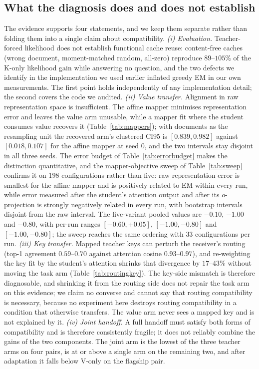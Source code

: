 \documentclass[11pt]{article}
\begin{document}
\subsection{What the diagnosis does and does not establish}
\label{sec:discussion-scope}
The evidence supports four statements, and we keep them separate rather than
folding them into a single claim about compatibility.
\emph{(i) Evaluation.} Teacher-forced likelihood does not establish functional
cache reuse: content-free caches (wrong document, moment-matched random,
all-zero) reproduce $89$--$105\%$ of the K-only likelihood gain while answering
no question, and the two defects we identify in the implementation we used
earlier inflated greedy EM in our own measurements. The first point holds
independently of any implementation detail; the second covers the code we
audited.
\emph{(ii) Value transfer.} Alignment in raw representation space is
insufficient. The affine mapper minimises representation error and leaves the
value arm unusable, while a mapper fit where the student consumes value recovers
it (Table~\ref{tab:mappers}); with documents as the resampling unit the recovered
arm's clustered CI95 is $[0.839, 0.982]$ against $[0.018, 0.107]$ for the affine
mapper at seed 0, and the two intervals stay disjoint in all three seeds. The
error budget of Table~\ref{tab:errorbudget} makes the distinction quantitative,
and the mapper-objective sweep of Table~\ref{tab:sweep} confirms it on $198$
configurations rather than five: raw representation error is smallest for the
affine mapper and is positively related to EM within every run, while error
measured after the student's attention output and after its $o$-projection is
strongly negatively related in every run, with bootstrap intervals disjoint from
the raw interval. The five-variant pooled values are $-0.10$, $-1.00$ and
$-0.80$, with per-run ranges $[-0.60,+0.05]$, $[-1.00,-0.80]$ and
$[-1.00,-0.80]$; the sweep reaches the same ordering with $33$ configurations per
run.
\emph{(iii) Key transfer.} Mapped teacher keys can perturb the receiver's
routing (top-1 agreement $0.59$--$0.70$ against attention cosine
$0.93$--$0.97$), and re-weighting the key fit by the student's attention shrinks
that divergence by $17$--$43\%$ without moving the task arm
(Table~\ref{tab:routingkey}). The key-side mismatch is therefore diagnosable, and
shrinking it from the routing side does not repair the task arm on this evidence;
we claim no converse and cannot say that routing compatibility is necessary,
because no experiment here destroys routing compatibility in a condition that
otherwise transfers. The value arm never
sees a mapped key and is not explained by it.
\emph{(iv) Joint handoff.} A full handoff must satisfy both forms of
compatibility and is therefore consistently fragile; it does not reliably combine
the gains of the two components. The joint arm is the lowest of the three teacher
arms on four pairs, is at or above a single arm on the remaining two, and after
adaptation it falls below V-only on the flagship pair.
\end{document}

